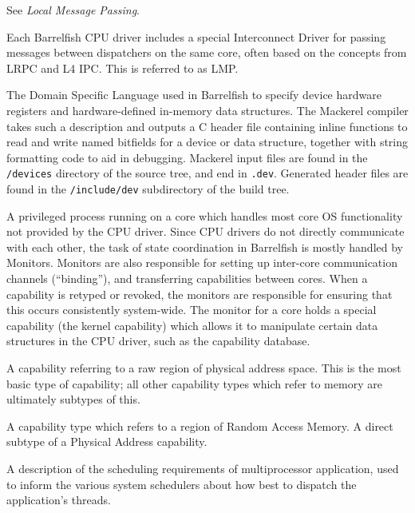 \item[LMP:] See \textit{Local Message Passing}.

\item[Local Message Passing \textrm{\textit{(LMP)}}:] Each Barrelfish CPU driver includes a special Interconnect Driver for passing messages between dispatchers on the same core, often based on the concepts from LRPC and L4 IPC.  This is referred to as LMP.

\item[Mackerel:] The Domain Specific Language used in Barrelfish to specify device hardware registers and hardware-defined in-memory data structures.  The Mackerel compiler takes such a description and outputs a C header file containing inline functions to read and write named bitfields for a device or data structure, together with string formatting code to aid in debugging.  Mackerel input files are found in the \texttt{/devices} directory of the source tree, and end in \texttt{.dev}.  Generated header files are found in the \texttt{/include/dev} subdirectory of the build tree.

\item[monitor:] A privileged process running on a core which handles most core OS functionality not provided by the CPU driver.  Since CPU drivers do not directly communicate with each other, the task of state coordination in Barrelfish is mostly handled by Monitors.  Monitors are also responsible for setting up inter-core communication channels (``binding''), and transferring capabilities between cores.  When a capability is retyped or revoked, the monitors are responsible for ensuring that this occurs consistently system-wide.  The monitor for a core holds a special capability (the kernel capability) which allows it to manipulate certain data structures in the CPU driver, such as the capability database.

\item[physical address capability:] A capability referring to a raw region of physical address space.  This is the most basic type of capability; all other capability types which refer to memory are ultimately subtypes of this.

\item[RAM capability:] A capability type which refers to a region of Random Access Memory.  A direct subtype of a Physical Address capability.

\item[scheduler manifest:] A description of the scheduling requirements of multiprocessor application, used to inform the various system schedulers about how best to dispatch the application's threads.

